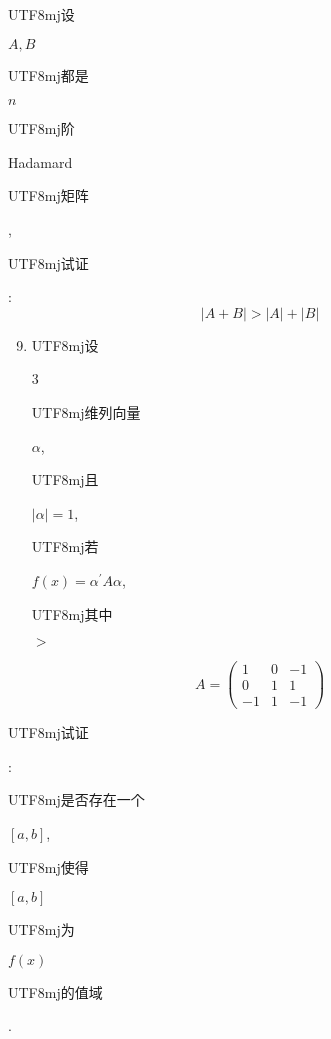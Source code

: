 \documentclass[10pt]{article}
\begin{document}
\begin{CJK}{UTF8}{mj}设\end{CJK} $A, B$ \begin{CJK}{UTF8}{mj}都是\end{CJK} $n$ \begin{CJK}{UTF8}{mj}阶\end{CJK} Hadamard \begin{CJK}{UTF8}{mj}矩阵\end{CJK}, \begin{CJK}{UTF8}{mj}试证\end{CJK}:
$$
|A+B|>|A|+|B|
$$

\begin{enumerate}
  \setcounter{enumi}{8}
  \item \begin{CJK}{UTF8}{mj}设\end{CJK} 3 \begin{CJK}{UTF8}{mj}维列向量\end{CJK} $\alpha$, \begin{CJK}{UTF8}{mj}且\end{CJK} $|\alpha|=1$, \begin{CJK}{UTF8}{mj}若\end{CJK} $f(x)=\alpha^{\prime} A \alpha$, \begin{CJK}{UTF8}{mj}其中\end{CJK} $>$
\end{enumerate}
$$
A=\left(\begin{array}{ccc}
1 & 0 & -1 \\
0 & 1 & 1 \\
-1 & 1 & -1
\end{array}\right)
$$
\begin{CJK}{UTF8}{mj}试证\end{CJK}: \begin{CJK}{UTF8}{mj}是否存在一个\end{CJK} $[a, b]$, \begin{CJK}{UTF8}{mj}使得\end{CJK} $[a, b]$ \begin{CJK}{UTF8}{mj}为\end{CJK} $f(x)$ \begin{CJK}{UTF8}{mj}的值域\end{CJK}.
\end{document}
